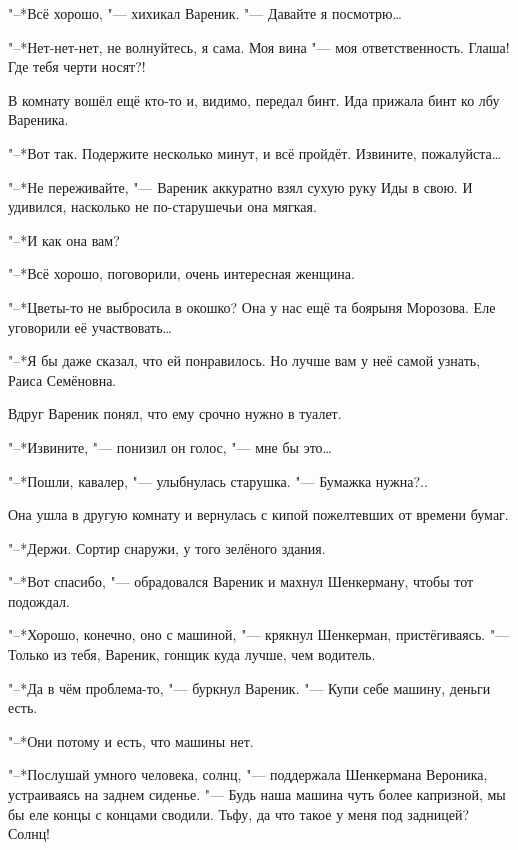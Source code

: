 "--*Всё хорошо, "--- хихикал Вареник.
"--- Давайте я посмотрю\ldots{}

"--*Нет-нет-нет, не волнуйтесь, я сама.
Моя вина "--- моя ответственность.
Глаша!
Где тебя черти носят?!

В комнату вошёл ещё кто-то и, видимо, передал бинт.
Ида прижала бинт ко лбу Вареника.

"--*Вот так.
Подержите несколько минут, и всё пройдёт.
Извините, пожалуйста\ldots{}

"--*Не переживайте, "--- Вареник аккуратно взял сухую руку Иды в свою.
И удивился, насколько не по-старушечьи она мягкая.

\textspace

"--*И как она вам?

"--*Всё хорошо, поговорили, очень интересная женщина.

"--*Цветы-то не выбросила в окошко?
Она у нас ещё та боярыня Морозова.
Еле уговорили её участвовать\ldots{}

"--*Я бы даже сказал, что ей понравилось.
Но лучше вам у неё самой узнать, Раиса Семёновна.

Вдруг Вареник понял, что ему срочно нужно в туалет.

"--*Извините, "--- понизил он голос, "--- мне бы это\ldots{}

"--*Пошли, кавалер, "--- улыбнулась старушка.
"--- Бумажка нужна?..

Она ушла в другую комнату и вернулась с кипой пожелтевших от времени бумаг.

"--*Держи.
Сортир снаружи, у того зелёного здания.

"--*Вот спасибо, "--- обрадовался Вареник и махнул Шенкерману, чтобы тот подождал.

\textspace

\asterism

\textspace

"--*Хорошо, конечно, оно с машиной, "--- крякнул Шенкерман, пристёгиваясь.
"--- Только из тебя, Вареник, гонщик куда лучше, чем водитель.

"--*Да в чём проблема-то, "--- буркнул Вареник.
"--- Купи себе машину, деньги есть.

"--*Они потому и есть, что машины нет.

"--*Послушай умного человека, солнц, "--- поддержала Шенкермана Вероника, устраиваясь на заднем сиденье.
"--- Будь наша машина чуть более капризной, мы бы еле концы с концами сводили.
Тьфу, да что такое у меня под задницей?
Солнц!

